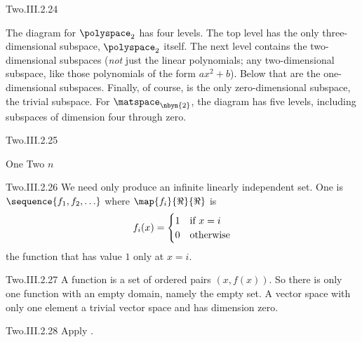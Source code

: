 \begin{ans}{Two.III.2.24}
      \begin{exparts}
       \partsitem The diagram for $\polyspace_2$ has four levels.
          The top level has the only three-dimensional subspace,
          $\polyspace_2$ itself.
          The next level contains the two-dimensional subspaces
          (\emph{not} just the linear polynomials; any two-dimensional
          subspace, like those polynomials of the form $ax^2+b$).
          Below that are the one-dimensional subspaces.
          Finally, of course, is the only zero-dimensional subspace,
          the trivial subspace.
        \partsitem For $\matspace_{\nbyn{2}}$, the diagram has five levels,
          including subspaces of dimension four through zero.
     \end{exparts}
    
\end{ans}
\begin{ans}{Two.III.2.25}
      \begin{exparts*}
        \partsitem One
        \partsitem Two
        \partsitem \( n \)
      \end{exparts*}
    
\end{ans}
\begin{ans}{Two.III.2.26}
      We need only produce an infinite linearly independent set.
      One is \( \sequence{f_1,f_2,\ldots} \) where
      \( \map{f_i}{\Re}{\Re} \) is
      \begin{equation*}
         f_i(x)=\begin{cases}
                   1  &\text{if \( x=i \)}  \\
                   0  &\text{otherwise}
                \end{cases}
      \end{equation*}
      the function that has value $1$ only at $x=i$.
    
\end{ans}
\begin{ans}{Two.III.2.27}
      A function is a set of ordered pairs
      $(x,f(x))$.
      So there is only one function with an empty domain, namely the empty set.
      A vector space with only one element a trivial vector space
      and has dimension zero.
    
\end{ans}
\begin{ans}{Two.III.2.28}
      Apply .
    
\end{ans}
